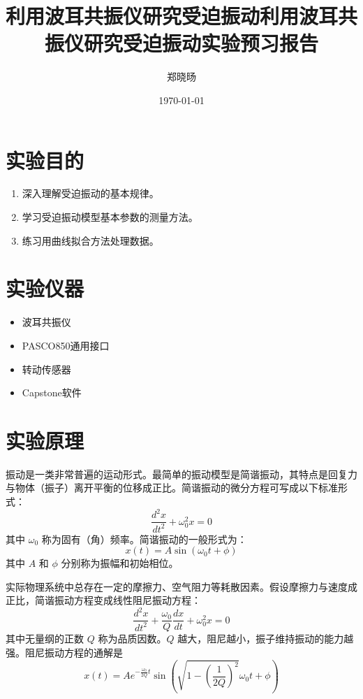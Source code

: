 \documentclass[UTF8]{ctexart}
\title{利用波耳共振仪研究受迫振动}
\title{利用波耳共振仪研究受迫振动实验预习报告}
\author{郑晓旸}
\date{\today}
\begin{document}
\fancyfoot[C]{\thepage}

\maketitle
\tableofcontents
\newpage

\section{实验目的}
\begin{enumerate}
    \item 深入理解受迫振动的基本规律。
    \item 学习受迫振动模型基本参数的测量方法。
    \item 练习用曲线拟合方法处理数据。
\end{enumerate}

\section{实验仪器}
\begin{itemize}
    \item 波耳共振仪
    \item PASCO850通用接口
    \item 转动传感器
    \item Capstone软件
\end{itemize}

\section{实验原理}
振动是一类非常普遍的运动形式。最简单的振动模型是简谐振动，其特点是回复力与物体（振子）离开平衡的位移成正比。简谐振动的微分方程可写成以下标准形式：
\begin{equation}
\frac{d^2 x}{d t^2} + \omega_0^2 x = 0
\end{equation}
其中 $\omega_0$ 称为固有（角）频率。简谐振动的一般形式为：
\begin{equation}
x(t) = A \sin(\omega_0 t + \phi)
\end{equation}
其中 $A$ 和 $\phi$ 分别称为振幅和初始相位。

实际物理系统中总存在一定的摩擦力、空气阻力等耗散因素。假设摩擦力与速度成正比，简谐振动方程变成线性阻尼振动方程：
\begin{equation}
\frac{d^2 x}{d t^2} + \frac{\omega_0}{Q} \frac{d x}{d t} + \omega_0^2 x = 0
\end{equation}
其中无量纲的正数 $Q$ 称为品质因数。$Q$ 越大，阻尼越小，振子维持振动的能力越强。阻尼振动方程的通解是
\begin{equation}
x(t) = A e^{-\frac{\omega_0}{2Q} t} \sin\left(\sqrt{1 - \left(\frac{1}{2Q}\right)^2} \omega_0 t + \phi\right)
\end{equation}
\end{document}
